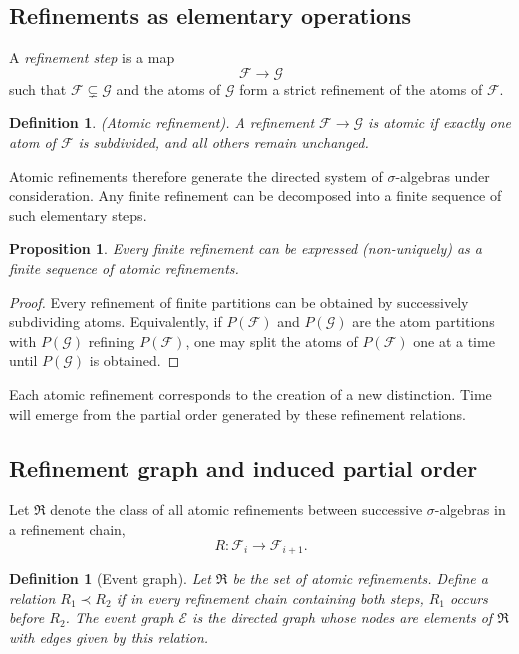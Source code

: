 \documentclass[
 amsmath,amssymb,
  onecolumn %
]{revtex4-2}
\newtheorem{proposition}[theorem]{Proposition}
\newtheorem{definition}[theorem]{Definition}
\begin{document}
\subsection{Refinements as elementary operations} 
A \emph{refinement step} is a map
$$
\mathcal{F} \longrightarrow \mathcal{G}
$$
such that $ \mathcal{F} \subsetneq \mathcal{G} $ and the atoms of $ \mathcal{G} $ form a strict refinement of the atoms of $ \mathcal{F} $.
\begin{definition} (Atomic refinement).
A refinement $ \mathcal{F} \to \mathcal{G} $ is \emph{atomic} if exactly one atom of $\mathcal{F}$ is subdivided, and all others remain unchanged.
\end{definition} 
Atomic refinements therefore generate the directed system of
$\sigma$-algebras under consideration. Any finite refinement can
be decomposed into a finite sequence of such elementary steps.
\begin{proposition} 
Every finite refinement can be expressed (non-uniquely) as a finite sequence of atomic refinements.
\end{proposition} 
\begin{proof}
Every refinement of finite partitions can be obtained by
successively subdividing atoms.
Equivalently, if $P(\mathcal F)$ and $P(\mathcal G)$ are the atom
partitions with $P(\mathcal G)$ refining $P(\mathcal F)$,
one may split the atoms of $P(\mathcal F)$ one at a time until
$P(\mathcal G)$ is obtained.
\end{proof}
Each atomic refinement corresponds to the creation of a new distinction. Time will emerge from the partial order generated by these refinement relations.

\subsection{Refinement graph and induced partial order} 
Let $\mathfrak{R}$ denote the class of all atomic refinements
between successive $\sigma$-algebras in a refinement chain,
$$
R : \mathcal{F}_i \longrightarrow \mathcal{F}_{i+1}.
$$

\begin{definition}[Event graph]
Let $\mathfrak R$ be the set of atomic refinements.
Define a relation $R_1\prec R_2$ if in every refinement chain
containing both steps, $R_1$ occurs before $R_2$.
The event graph $\mathcal E$ is the directed graph whose nodes are
elements of $\mathfrak R$ with edges given by this relation.
\end{definition}
\end{document}
